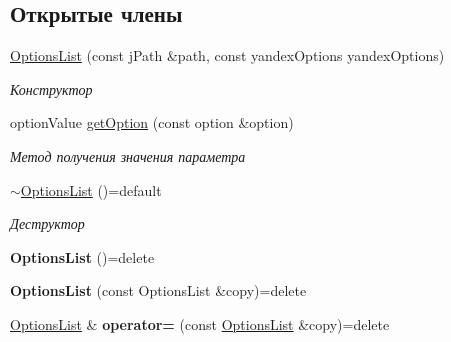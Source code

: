 \subsection*{Открытые члены}
\begin{DoxyCompactItemize}
\item 
\hyperlink{classJarvis_1_1connection_1_1Transport_a2cb5e9e28fa84404e8b002c65fe8ecd0}{Options\+List} (const j\+Path \&path, const yandex\+Options yandex\+Options)
\begin{DoxyCompactList}\small\item\em Конструктор \end{DoxyCompactList}\item 
option\+Value \hyperlink{classJarvis_1_1connection_1_1Transport_a46481607af9201bd96cd37f44ab3f02a}{get\+Option} (const option \&option)
\begin{DoxyCompactList}\small\item\em Метод получения значения параметра \end{DoxyCompactList}\item 
\mbox{\label{classJarvis_1_1connection_1_1Transport_a6e9599cad725bc1d305908a0c6325511}} 
\hyperlink{classJarvis_1_1connection_1_1Transport_a6e9599cad725bc1d305908a0c6325511}{$\sim$\+Options\+List} ()=default
\begin{DoxyCompactList}\small\item\em Деструктор \end{DoxyCompactList}\item 
\mbox{\label{classJarvis_1_1connection_1_1Transport_ab80ef9d2e0ff34de3a81fe653fd66563}} 
{\bfseries Options\+List} ()=delete
\item 
\mbox{\label{classJarvis_1_1connection_1_1Transport_a8e67b3b2abea1422f25bf1fa583c3081}} 
{\bfseries Options\+List} (const Options\+List \&copy)=delete
\item 
\mbox{\label{classJarvis_1_1connection_1_1Transport_ad32df85374b4ebe723e829521fde41ec}} 
\hyperlink{classJarvis_1_1connection_1_1Transport_a2cb5e9e28fa84404e8b002c65fe8ecd0}{Options\+List} \& {\bfseries operator=} (const \hyperlink{classJarvis_1_1connection_1_1Transport_a2cb5e9e28fa84404e8b002c65fe8ecd0}{Options\+List} \&copy)=delete
\item 

\end{DoxyCompactItemize}
